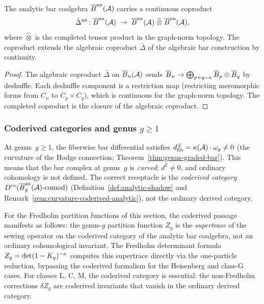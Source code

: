 \begin{proposition}%
\label{prop:thqg-X-analytic-coproduct}%
%
The analytic bar coalgebra $\overline{B}^{\mathrm{an}}(\mathcal{A})$ carries a continuous
coproduct
\begin{equation}\label{eq:thqg-X-analytic-coproduct}
\bar{\Delta}^{\mathrm{an}} \colon
\overline{B}^{\mathrm{an}}(\mathcal{A})
\;\to\;
\overline{B}^{\mathrm{an}}(\mathcal{A})
\;\widehat{\otimes}\;
\overline{B}^{\mathrm{an}}(\mathcal{A}),
\end{equation}
where $\widehat{\otimes}$ is the completed tensor product
in the graph-norm topology. The coproduct extends the algebraic
coproduct $\bar{\Delta}$ of the algebraic bar construction
by continuity.
\end{proposition}

\begin{proof}
The algebraic coproduct $\bar{\Delta}$ on $\overline{B}_n(\mathcal{A})$
sends $\overline{B}_n \to \bigoplus_{p+q=n} \overline{B}_p \otimes \overline{B}_q$
by deshuffle. Each deshuffle component is a restriction map
(restricting meromorphic forms from $C_n$ to
$C_p \times C_q$), which is continuous for the graph-norm
topology. The completed coproduct is the closure of the
algebraic coproduct.
\end{proof}

\subsubsection{Coderived categories and genus $g \geq 1$}

\begin{remark}%
\label{rem:thqg-X-coderived-review}%
%
At genus~$g \geq 1$, the fiberwise bar differential satisfies
$d_{\mathrm{fib}}^{\,2} = \kappa(\mathcal{A}) \cdot \omega_g \neq 0$
(the curvature of the Hodge connection;
Theorem~\ref{thm:genus-graded-bar}). This means that the
bar complex at genus~$g$ is \emph{curved}: $d^2 \neq 0$,
and ordinary cohomology is not defined. The correct
receptacle is the \emph{coderived category}
$D^{\mathrm{co}}(\overline{B}^{\mathrm{an}}_g(\mathcal{A})\text{-comod})$
(Definition~\ref{def:analytic-shadow} and
Remark~\ref{rem:curvature-coderived-analytic}), not the
ordinary derived category.

For the Fredholm partition functions of this section, the
coderived passage manifests as follows: the genus-$g$
partition function $Z_g$ is the \emph{supertrace} of the
sewing operator on the coderived category of the analytic bar
coalgebra, not an ordinary cohomological invariant. The
Fredholm determinant formula
$Z_g = \det(1 - K_g)^{-\kappa}$ computes this
supertrace directly via the one-particle reduction, bypassing
the coderived formalism for the Heisenberg and class-G cases.
For classes L, C, M, the coderived category is essential: the
non-Fredholm corrections $\delta Z_g$ are coderived
invariants that vanish in the ordinary derived category.
\end{remark}

